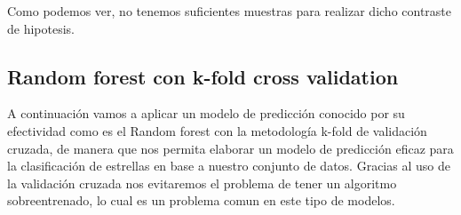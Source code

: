 \documentclass[
]{article}
\begin{document}
Como podemos ver, no tenemos suficientes muestras para realizar dicho
contraste de hipotesis.

\hypertarget{random-forest-con-k-fold-cross-validation}{%
\subsection{Random forest con k-fold cross
validation}\label{random-forest-con-k-fold-cross-validation}}

A continuación vamos a aplicar un modelo de predicción conocido por su
efectividad como es el Random forest con la metodología k-fold de
validación cruzada, de manera que nos permita elaborar un modelo de
predicción eficaz para la clasificación de estrellas en base a nuestro
conjunto de datos. Gracias al uso de la validación cruzada nos
evitaremos el problema de tener un algoritmo sobreentrenado, lo cual es
un problema comun en este tipo de modelos.
\end{document}
